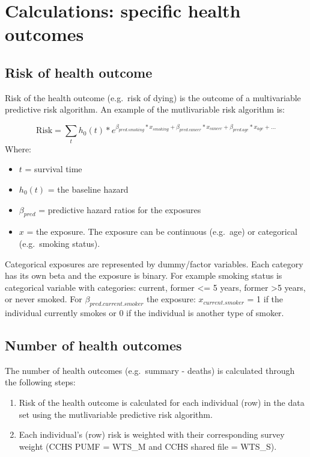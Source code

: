 \documentclass[]{book}
\providecommand{\tightlist}{%
  \setlength{\itemsep}{0pt}\setlength{\parskip}{0pt}}
\begin{document}
\section{Calculations: specific health
outcomes}\label{calculations-specific-health-outcomes}

\subsection{Risk of health outcome}\label{risk-of-health-outcome}

Risk of the health outcome (e.g.~risk of dying) is the outcome of a
multivariable predictive risk algorithm. An example of the mutlivariable
risk algorithm is:

\[ \text{Risk} = \sum_t h_0(t) * e^{\beta_{pred.smoking}*x_{smoking}+\beta_{pred.cancer}*x_{cancer} + \beta_{pred.age}*x_{age} +...}  \]
Where:

\begin{itemize}
\tightlist
\item
  \(t\) = survival time
\item
  \(h_0(t)\) = the baseline hazard
\item
  \(\beta_{pred}\) = predictive hazard ratios for the exposures
\item
  \(x\) = the exposure. The exposure can be continuous (e.g.~age) or
  categorical (e.g.~smoking status).
\end{itemize}

Categorical exposures are represented by dummy/factor variables. Each
category has its own beta and the exposure is binary. For example
smoking status is categorical variable with categories: current, former
\textless{}= 5 years, former \textgreater{}5 years, or never smoked. For
\(\beta_{pred.current.smoker}\) the exposure: \(x_{current.smoker}\) = 1
if the individual currently smokes or 0 if the individual is another
type of smoker.

\subsection{Number of health outcomes}\label{number-of-health-outcomes}

The number of health outcomes (e.g.~summary - deaths) is calculated
through the following steps:

\begin{enumerate}
\def\labelenumi{\arabic{enumi}.}
\tightlist
\item
  Risk of the health outcome is calculated for each individual (row) in
  the data set using the mutlivariable predictive risk algorithm.
\item
  Each individual's (row) risk is weighted with their corresponding
  survey weight (CCHS PUMF = WTS\_M and CCHS shared file = WTS\_S).
\end{enumerate}
\end{document}
